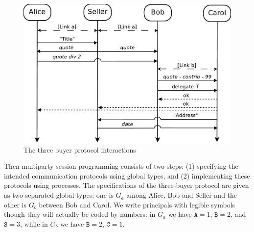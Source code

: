 \documentclass[a4paper,11pt,twoside]{report}
\newcommand{\participant}[1]{\ensuremath{\mathtt{#1}}}
\begin{document}
\begin{figure}[tb]
\begin{center}
\includegraphics[scale=0.25]{three_buyer_protocol}
\end{center}
\caption{The three buyer protocol interactions}\label{fig:threebuyers}
\end{figure}

Then multiparty session programming consists of two steps: (1) specifying the intended communication protocols using global types,
and (2) implementing these protocols using processes. The specifications of the three-buyer protocol are given as two separated global types: one is $G_a$  among Alice, Bob and Seller and the other is $G_b$ between Bob and Carol. We write principals with legible symbols though they will actually be coded by numbers: in $G_a$ we have  $\participant{A}=1$, $\participant{B}=2$, and $\participant{S}=3$, while in $G_b$ we have $\participant{B}=2$, $\participant{C}=1$.\\[0.5mm]
\newcommand{\nm}[1]{{\texttt{\scriptsize #1.}}}
\end{document}
